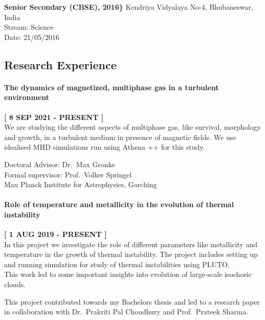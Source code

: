 \documentclass[
  a4paper,
  11pt,
  oneside]{article}
\let\oldparagraph\paragraph
\renewcommand{\paragraph}[1]{\oldparagraph{#1}\mbox{}}
\begin{document}
\textbf{Senior Secondary (CBSE), 2016\}} Kendriya Vidyalaya No-4,
Bhubaneswar, India\\
Stream: Science\\
Date: 21/05/2016

\hypertarget{research-experience}{%
\subsection{Research Experience}\label{research-experience}}

\hypertarget{the-dynamics-of-magnetized-multiphase-gas-in-a-turbulent-environment}{%
\paragraph{The dynamics of magnetized, multiphase gas in a turbulent
environment}\label{the-dynamics-of-magnetized-multiphase-gas-in-a-turbulent-environment}}

\textbf{{[} 8 SEP 2021 - PRESENT {]}}\\
We are studying the different aspects of multiphase gas, like survival,
morphology and growth, in a turbulent medium in presence of magnetic
fields. We use idealised MHD simulations run using Athena ++ for this
study.

Doctoral Advisor: Dr.~Max Gronke\\
Formal supervisor: Prof.~Volker Springel\\
Max Planck Institute for Astrophysics, Garching

\hypertarget{role-of-temperature-and-metallicity-in-the-evolution-of-thermal-instability}{%
\paragraph{Role of temperature and metallicity in the evolution of
thermal
instability}\label{role-of-temperature-and-metallicity-in-the-evolution-of-thermal-instability}}

\textbf{{[} 1 AUG 2019 - PRESENT {]}}\\
In this project we investigate the role of different parameters like
metallicity and temperature in the growth of thermal instability. The
project includes setting up and running simulation for study of thermal
instabilities using PLUTO.\\
This work led to some important insights into evolution of large-scale
isochoric clouds.

This project contributed towards my Bachelors thesis and led to a
research paper in collaboration with Dr.~Prakriti Pal Choudhury and
Prof.~Prateek Sharma.
\end{document}
